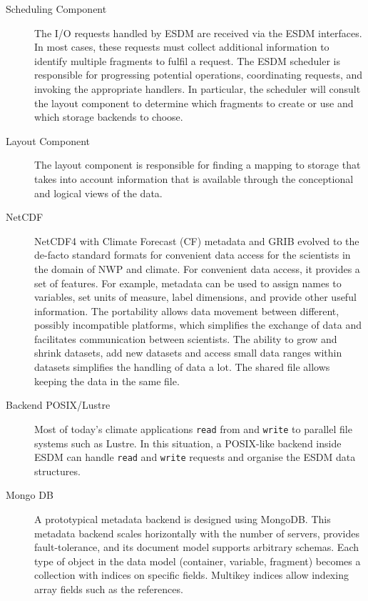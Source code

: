 \begin{description}

\item[Scheduling Component]

The I/O requests handled by ESDM are received via the ESDM interfaces.
In most cases, these requests must collect additional information to identify multiple fragments to fulfil a request.
The ESDM scheduler is responsible for progressing potential operations, coordinating requests, and invoking the appropriate handlers.
In particular, the scheduler will consult the layout component to determine which fragments to create or use and which storage backends to choose.

\item[Layout Component]

The layout component is responsible for finding a mapping to storage that takes into account information that is available through the conceptional and logical views of the data.

\item[NetCDF]

NetCDF4 with Climate Forecast (CF) metadata and GRIB evolved to the de-facto standard
formats for convenient data access for the scientists in the domain of NWP and climate. For
convenient data access, it provides a set of features. For example, metadata can be used to
assign names to variables, set units of measure, label dimensions, and provide other useful
information. The portability allows data movement between different, possibly incompatible
platforms, which simplifies the exchange of data and facilitates communication between scientists.
The ability to grow and shrink datasets, add new datasets and access small data ranges
within datasets simplifies the handling of data a lot. The shared file allows keeping the data
in the same file.

\item[Backend POSIX/Lustre]

Most of today's climate applications \texttt{read} from and \texttt{write} to parallel file systems such as Lustre.
In this situation, a POSIX-like backend inside ESDM can handle \texttt{read} and \texttt{write} requests and organise the ESDM data structures.

\item[Mongo DB]

A prototypical metadata backend is designed using MongoDB. This metadata backend
scales horizontally with the number of servers, provides fault-tolerance, and its document model supports arbitrary schemas.
Each type of object in the data model (container, variable, fragment) becomes a collection with indices on specific fields.
Multikey indices allow indexing array fields such as the references.


\end{description}
